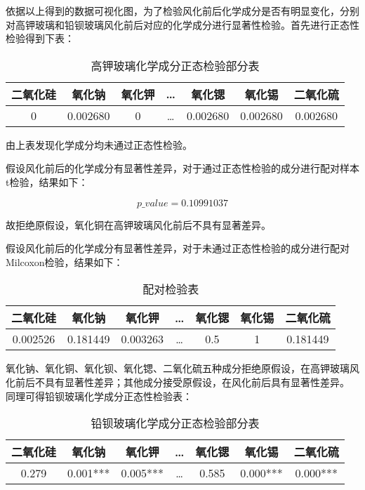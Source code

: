 依据以上得到的数据可视化图，为了检验风化前后化学成分是否有明显变化，分别对高钾玻璃和铅钡玻璃风化前后对应的化学成分进行显著性检验。首先进行正态性检验得到下表：

\begin{table}[H]
	\centering
	\begin{tabular}{c c c c c c c} 
	    \toprule[1.5pt]    
		二氧化硅 & 氧化钠 & 氧化钾 & 	… & 氧化锶 & 氧化锡 & 二氧化硫 \\
		\midrule[1pt]
		0 &	0.002680 &	0 &	… &	0.002680 &	0.002680 &	0.002680 \\
	    \toprule[1.5pt]
	\end{tabular}
\caption{高钾玻璃化学成分正态检验部分表}
\end{table}

由上表发现化学成分均未通过正态性检验。

假设风化前后的化学成分有显著性差异，对于通过正态性检验的成分进行配对样本t检验，结果如下：

\[p\_value = 0.10991037\]

故拒绝原假设，氧化铜在高钾玻璃风化前后不具有显著差异。

假设风化前后的化学成分有显著性差异，对于未通过正态性检验的成分进行配对Milcoxon检验，结果如下：

\begin{table}[H]
	\centering
	\begin{tabular}{c c c c c c c} 
		\toprule[1.5pt]
		二氧化硅 &	氧化钠 & 氧化钾 &	… &	氧化锶 & 氧化锡 &	二氧化硫 \\
		\midrule[1pt]
		0.002526 &	0.181449 &	0.003263 &	… &	0.5 & 1 & 0.181449 \\
		\toprule[1.5pt]
	\end{tabular}
\caption{配对检验表}
\end{table}

氧化钠、氧化铜、氧化钡、氧化锶、二氧化硫五种成分拒绝原假设，在高钾玻璃风化前后不具有显著性差异；其他成分接受原假设，在风化前后具有显著性差异。
同理可得铅钡玻璃化学成分正态性检验表：

\begin{table}[H]
	\centering
	\begin{tabular}{c c c c c c c} 
		\toprule[1.5pt]
		二氧化硅 & 氧化钠 & 氧化钾 & … & 氧化锶 & 氧化锡 & 二氧化硫 \\
		\midrule[1pt]
		0.279 & 0.001*** &	0.005*** &	… &	0.585 &	0.000*** & 0.000*** \\
		\toprule[1.5pt]
	\end{tabular}
\caption{铅钡玻璃化学成分正态检验部分表}
\end{table}

